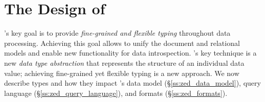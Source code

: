 \vspace{-0.8em}
\section{The Design of \sys{}}

\sys{}'s key goal is to provide {\em fine-grained and flexible typing} throughout data processing. Achieving this goal allows \sys{} to unify the document and relational models 
and enable new functionality for data introspection. \sys{}'s key technique is a new {\em data type abstraction} that represents the structure of an individual data value; achieving fine-grained yet flexible typing is a new approach. We now describe \sys{} types and how they impact \sys{}'s data model (\S\ref{ss:zed_data_model}), %
query language (\S\ref{ss:zed_query_language}), and formats  (\S\ref{ss:zed_formats}).


\begin{comment}
Realizing this type abstraction requires answering several design questions, such as:
\begin{CompactItemize}
    \item Type definitions - what should a type definition specify?
    \item Type evolution - how can we enable users to easily create new types on the fly?
    \item Type scope - what is the scope of a type definition and how can we relate types across different scopes?
    \item Querying types - how can we represent types in queries and in query results?
\end{CompactItemize}

In this section, we answer these questions by overviewing \sys{}'s super-structured data model (\S\ref{ss:zed_data_model}) and query language (\S\ref{ss:zed_query_language}). In addition, we observe that a single unified data model does not necessitate a single unified data format. As pointed out by prior work, no single format is best for all use cases~\cite{one_size_fits_all_2005, one_size_fits_all_2007}, and we describe how \sys{} supports multiple formats (human-readable, columnar binary, etc.) with lossless transformations between them (\S\ref{ss:zed_formats}). Finally, we explain how \sys{} manages type scope (\S\ref{ss:zed_type_contexts}).
\end{comment}

